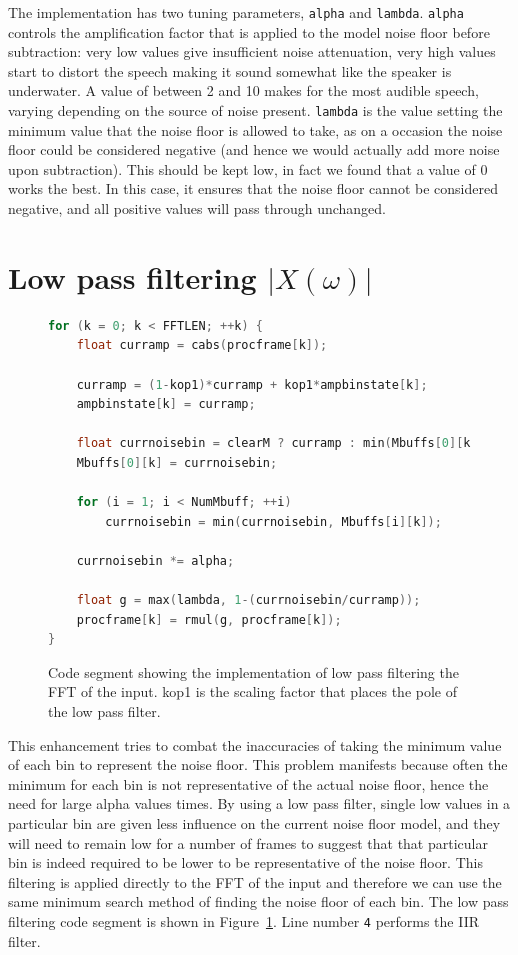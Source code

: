 \documentclass[11pt]{article} %
\begin{document}
{The implementation has two tuning parameters, \verb"alpha" and \verb"lambda". \verb"alpha" controls the amplification factor that is applied to the model noise floor before subtraction: very low values give insufficient noise attenuation, very high values start to distort the speech making it sound somewhat like the speaker is underwater. A value of between 2 and 10 makes for the most audible speech, varying depending on the source of noise present. 
\verb"lambda" is the value setting the minimum value that the noise floor is allowed to take, as on a occasion the noise floor could be considered negative (and hence we would actually add more noise upon subtraction). This should be kept low, in fact we found that a value of 0 works the best. In this case, it ensures that the noise floor cannot be considered negative, and all positive values will pass through unchanged.


\section{Low pass filtering $\lvert X(\omega) \rvert $} 
\label{sec:LPF}
\begin{figure}[htbp]
	\begin{center}
    \begin{lstlisting}[language = C]
for (k = 0; k < FFTLEN; ++k) {
	float curramp = cabs(procframe[k]); 

	curramp = (1-kop1)*curramp + kop1*ampbinstate[k];
	ampbinstate[k] = curramp;

	float currnoisebin = clearM ? curramp : min(Mbuffs[0][k], curramp);
	Mbuffs[0][k] = currnoisebin;

	for (i = 1; i < NumMbuff; ++i)
		currnoisebin = min(currnoisebin, Mbuffs[i][k]);

	currnoisebin *= alpha;

	float g = max(lambda, 1-(currnoisebin/curramp));
	procframe[k] = rmul(g, procframe[k]);
}
    \end{lstlisting}
  \end{center}
	\caption{Code segment showing the implementation of low pass filtering the FFT of the input. kop1 is the scaling factor that places the pole of the low pass filter.}
	\label{code:LPFxOMG}
\end{figure}

This enhancement tries to combat the inaccuracies of taking the minimum value of each bin to represent the noise floor. This problem manifests because often the minimum for each bin is not representative of the actual noise floor, hence the need for large alpha values times. By using a low pass filter, single low values in a particular bin are given less influence on the current noise floor model, and they will need to remain low for a number of frames to suggest that that particular bin is indeed required to be lower to be representative of the noise floor.
This filtering is applied directly to the FFT of the input and therefore we can use the same minimum search method of finding the noise floor of each bin. The low pass filtering code segment is shown in Figure~\ref{code:LPFxOMG}. Line number \verb"4" performs the IIR filter. 

}
\end{document}
